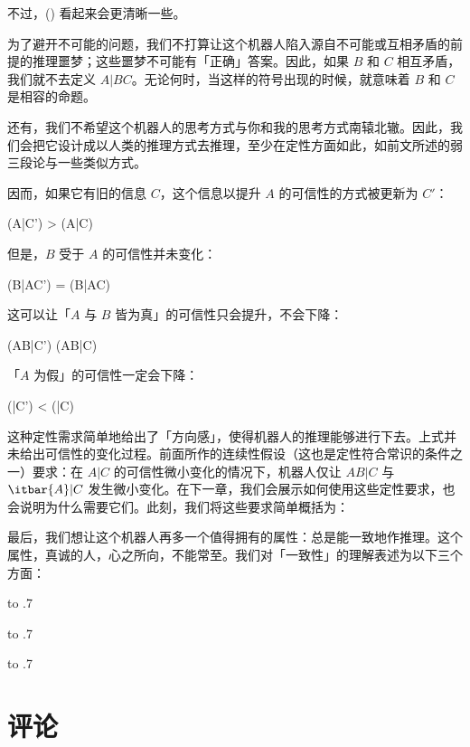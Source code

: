 不过，(\in[1-32]) 看起来会更清晰一些。

为了避开不可能的问题，我们不打算让这个机器人陷入源自不可能或互相矛盾的前提的推理噩梦；这些噩梦不可能有「正确」答案。因此，如果 $B$ 和 $C$ 相互矛盾，我们就不去定义 $A|BC$。无论何时，当这样的符号出现的时候，就意味着 $B$ 和 $C$ 是相容的命题。

还有，我们不希望这个机器人的思考方式与你和我的思考方式南辕北辙。因此，我们会把它设计成以人类的推理方式去推理，至少在定性方面如此，如前文所述的弱三段论与一些类似方式。

因而，如果它有旧的信息 $C$，这个信息以提升 $A$ 的可信性的方式被更新为 $C'$：

\placeformula
\startformula
(A|C') > (A|C)
\stopformula

但是，$B$ 受于 $A$ 的可信性并未变化：

\placeformula
\startformula
(B|AC') = (B|AC)
\stopformula

这可以让「$A$ 与 $B$ 皆为真」的可信性只会提升，不会下降：

\placeformula
\startformula
(AB|C') \ge (AB|C)
\stopformula

「$A$ 为假」的可信性一定会下降：

\placeformula
\startformula
(|C') < (|C)
\stopformula

这种定性需求简单地给出了「方向感」，使得机器人的推理能够进行下去。上式并未给出可信性的变化过程。前面所作的连续性假设（这也是定性符合常识的条件之一）要求：在 $A|C$ 的可信性微小变化的情况下，机器人仅让 $AB|C$ 与 $\itbar{A}|C$ 发生微小变化。在下一章，我们会展示如何使用这些定性要求，也会说明为什么需要它们。此刻，我们将这些要求简单概括为：

\placeformula[desiderata-2]
\startformula
{}\quad{}
\stopformula

最后，我们想让这个机器人再多一个值得拥有的属性：总是能一致地作推理。这个属性，真诚的人，心之所向，不能常至。我们对「一致性」的理解表述为以下三个方面：


\startsubformulas[desiderata-3a]
\placeformula
\startformula
{}\quad\hbox to .7
\stopformula

\placeformula[desiderata-3b]
\startformula
{}\quad\hbox to .7
\stopformula

\placeformula[desiderata-3c]
\startformula
{}\quad\hbox to .7
\stopformula
\stopsubformulas


\section{评论}